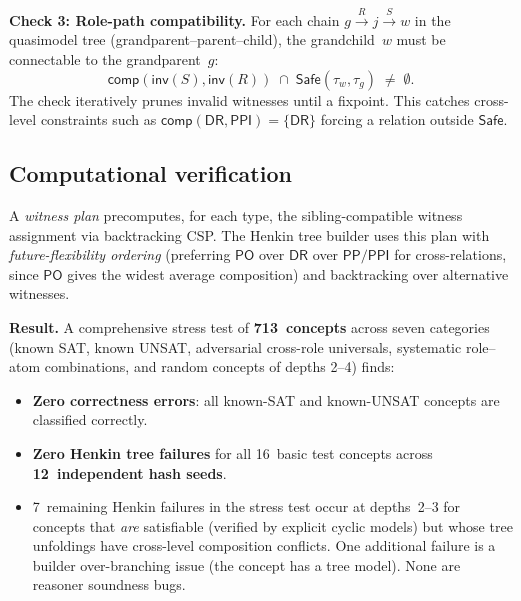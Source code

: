 \documentclass[a4paper,11pt]{article}
\theoremstyle{definition}
\newcommand{\DR}{\ensuremath{\mathsf{DR}}}
\newcommand{\PO}{\ensuremath{\mathsf{PO}}}
\newcommand{\PP}{\ensuremath{\mathsf{PP}}}
\newcommand{\PPI}{\ensuremath{\mathsf{PPI}}}
\newcommand{\inv}{\ensuremath{\mathsf{inv}}}
\newcommand{\comp}{\ensuremath{\mathsf{comp}}}
\newcommand{\Safe}{\ensuremath{\mathsf{Safe}}}
\begin{document}
\medskip\noindent\textbf{Check 3: Role-path compatibility.}\;
For each chain $g \xrightarrow{R} j \xrightarrow{S} w$ in the
quasimodel tree (grandparent--parent--child), the grandchild~$w$
must be connectable to the grandparent~$g$:
\[
  \comp(\inv(S), \inv(R)) \;\cap\; \Safe(\tau_w, \tau_g) \;\neq\; \emptyset.
\]
The check iteratively prunes invalid witnesses until a fixpoint.
This catches cross-level constraints such as
$\comp(\DR, \PPI) = \{\DR\}$ forcing a relation outside $\Safe$.

\subsection{Computational verification}

A \emph{witness plan} precomputes, for each type, the
sibling-compatible witness assignment via backtracking CSP.
The Henkin tree builder uses this plan with
\emph{future-flexibility ordering} (preferring $\PO$ over $\DR$
over $\PP/\PPI$ for cross-relations, since $\PO$ gives the
widest average composition) and backtracking over
alternative witnesses.

\medskip\noindent\textbf{Result.}\;
A comprehensive stress test of \textbf{713~concepts} across seven
categories (known SAT, known UNSAT, adversarial cross-role universals,
systematic role--atom combinations, and random concepts of depths
2--4) finds:
\begin{itemize}[nosep]
\item \textbf{Zero correctness errors}: all known-SAT and known-UNSAT
  concepts are classified correctly.
\item \textbf{Zero Henkin tree failures} for all 16~basic test concepts
  across \textbf{12~independent hash seeds}.
\item 7~remaining Henkin failures in the stress test occur at depths~2--3
  for concepts that \emph{are} satisfiable (verified by explicit
  cyclic models) but whose tree unfoldings have cross-level
  composition conflicts.  One additional failure is a builder
  over-branching issue (the concept has a tree model).
  None are reasoner soundness bugs.
\end{itemize}
\end{document}
